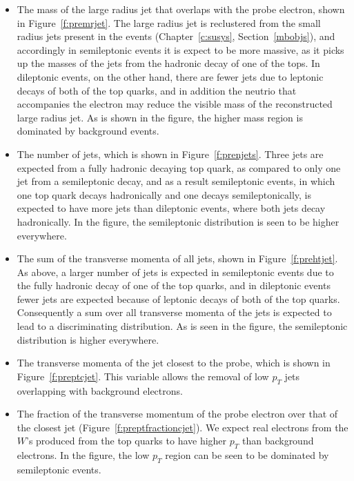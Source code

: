 \begin{itemize}

	\item The mass of the large radius jet that overlaps with the probe electron,
	      shown in Figure~\ref{f:premrjet}. The large radius jet is reclustered from the
	      small radius jets present in the events (Chapter~\ref{c:susys},
	      Section~\ref{mbobjs}), and accordingly in semileptonic events it is expect to be
	      more massive, as it picks up the masses of the jets from the hadronic decay of
	      one of the tops. In dileptonic events, on the other hand, there are fewer jets
	      due to leptonic decays of both of the top quarks, and in addition the
	      neutrio that accompanies the electron may reduce the visible mass of the
	      reconstructed large radius jet. As is shown in the figure, the higher mass
	      region is dominated by background events.


	\item The number of jets, which is shown in Figure~\ref{f:prenjets}. Three jets
	      are expected from a fully hadronic decaying top quark, as compared to only
	      one jet from a semileptonic decay, and as a result semileptonic events, in
	      which one top quark decays hadronically and one decays semileptonically, is
	      expected to have more jets than dileptonic events, where both jets decay
	      hadronically. In the figure, the semileptonic distribution is seen to be higher
	      everywhere.


	\item The sum of the transverse momenta of all jets, shown in
	      Figure~\ref{f:prehtjet}. As above, a larger number of jets is expected in
	      semileptonic events due to the fully hadronic decay of one of the top quarks,
	      and in dileptonic events fewer jets are expected because of leptonic decays of
	      both of the top quarks. Consequently a sum over all transverse momenta of the
	      jets is expected to lead to a discriminating distribution. As is seen in the
	      figure, the semileptonic distribution is higher everywhere.


	\item The transverse momenta of the jet closest to the probe, which is shown in
	      Figure~\ref{f:preptcjet}. This variable allows the removal of low $p_T$ jets
	      overlapping with background electrons.


	\item The fraction of the transverse momentum of the probe electron over that
	      of the closest jet (Figure~\ref{f:preptfractioncjet}). We expect real electrons
	      from the $W$'s produced from the top quarks to have higher $p_T$ than
	      background electrons. In the figure, the low $p_T$ region can be seen to be
	      dominated by semileptonic events.

\end{itemize}

